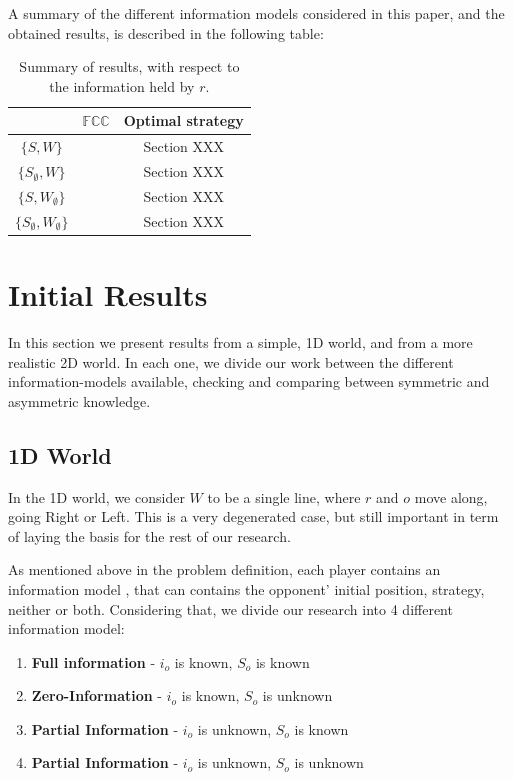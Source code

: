 \documentclass[a4paper,english,10pt]{article}
\newcommand\rob{\ensuremath{r}\xspace}
\newcommand\opp{\ensuremath{o}\xspace}
\newcommand{\w}{\ensuremath{W}\xspace}
\newcommand{\fcc}{\ensuremath{FCC}\xspace}
\begin{document}
A summary of the different information models considered in this paper, and the obtained results, is described in the following table:

%

\begin{table}[h]
\caption{Summary of results, with respect to the information held by \rob.}
\label{table_example}
\begin{center}
\begin{tabular}{|c||c|c|}
\hline 
& $\mathbb{\fcc}$ & Optimal strategy\\
\hline
$\lbrace S, \w \rbrace$ &  & Section XXX\\
\hline
$\lbrace S_{\emptyset}, \w \rbrace$ &  & Section XXX\\
\hline
$\lbrace S, \w_{\emptyset} \rbrace$ &  & Section XXX\\
\hline
$\lbrace S_{\emptyset}, \w_{\emptyset} \rbrace$ &  & Section XXX\\
\hline
\end{tabular}
\end{center}
\end{table}

\section{Initial Results}
In this section we present results from a simple, 1D world, and from a more realistic 2D world. In each one, we divide our work between the different information-models available, checking and comparing between symmetric and asymmetric knowledge.
\subsection{1D World}
In the 1D world, we consider \w to be a single line, where \rob and \opp move along, going Right or Left. This is a very degenerated case, but still important in term of laying the basis for the rest of our research.

As mentioned above in the problem definition, each player contains an information model , that can contains the opponent' initial position, strategy, neither or both. Considering that, we divide our research into 4 different information model:
\begin{enumerate}
\item \textbf{Full information} - $i_\opp$ is known, $S_\opp$ is known
\item \textbf{Zero-Information} - $i_\opp$ is known, $S_\opp$ is unknown
\item \textbf{Partial Information} -  $i_\opp$ is unknown, $S_\opp$ is known
\item \textbf{Partial Information} - $i_\opp$ is unknown, $S_\opp$ is unknown
\end{enumerate}
\end{document}
